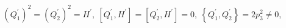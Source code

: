 \begin{equation}
\label{25}\left( Q_1^{\prime }\right) ^2=\left( Q_2^{\prime }\right)
^2=H^{\prime },\ \left[ Q_1^{\prime },H^{\prime }\right] =\left[ Q_2^{\prime
},H^{\prime }\right] =0,\ \left\{ Q_1^{\prime },Q_2^{\prime }\right\}
=2p_3^2\neq 0, 
\end{equation}

